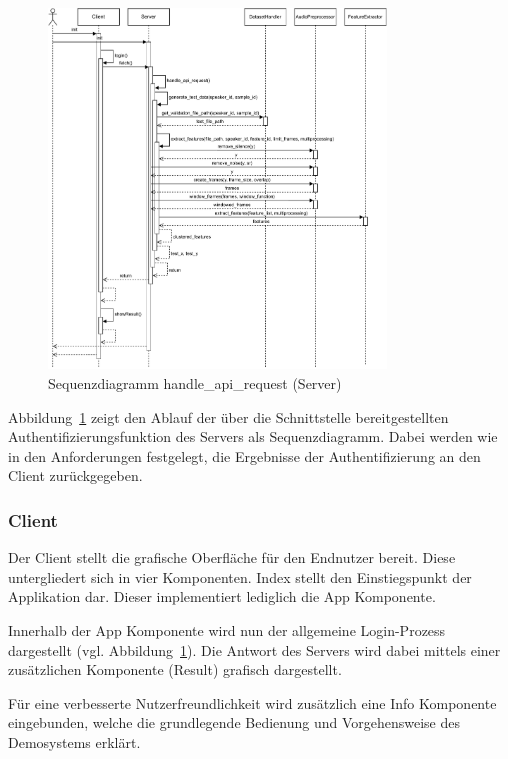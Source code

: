 \begin{figure}
    \centering
    \includegraphics[width=0.8\textwidth, keepaspectratio]{images/SequenzdiagrammClientServer}
    \caption{Sequenzdiagramm handle\_api\_request (Server)}
    \label{fig:SequenceHandleApiRequest}
\end{figure}
Abbildung~\ref{fig:SequenceHandleApiRequest} zeigt den Ablauf der über die Schnittstelle bereitgestellten Authentifizierungsfunktion des Servers als Sequenzdiagramm.
Dabei werden wie in den Anforderungen festgelegt, die Ergebnisse der Authentifizierung an den Client zurückgegeben.

\subsubsection{Client}
Der Client stellt die grafische Oberfläche für den Endnutzer bereit.
Diese untergliedert sich in vier Komponenten.
Index stellt den Einstiegspunkt der Applikation dar.
Dieser implementiert lediglich die App Komponente.

Innerhalb der App Komponente wird nun der allgemeine Login-Prozess dargestellt (vgl. Abbildung~\ref{fig:SequenceHandleApiRequest}).
Die Antwort des Servers wird dabei mittels einer zusätzlichen Komponente (Result) grafisch dargestellt.

Für eine verbesserte Nutzerfreundlichkeit wird zusätzlich eine Info Komponente eingebunden, welche die grundlegende Bedienung und Vorgehensweise des Demosystems erklärt.


